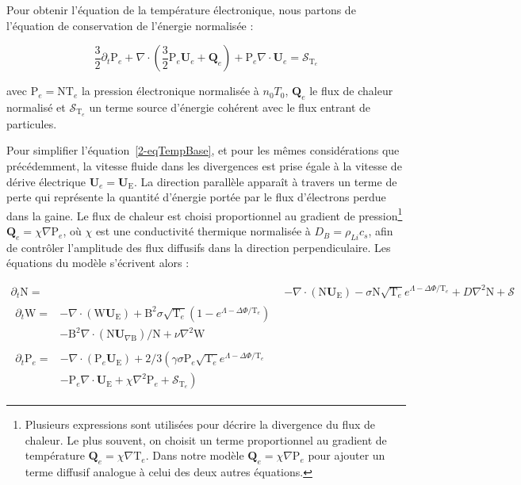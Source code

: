 \begin{refsection}
	Pour obtenir l'équation de la température électronique, nous partons de
	l'équation de conservation de l'énergie normalisée :
	
	\begin{equation} 
	\label{2-eqTempBase}
		\frac{3}{2}\partial_t \text{P}_e +
		\nabla\cdot\left(\frac{3}{2}\text{P}_e\mathbf{U}_e+\mathbf{Q}_e\right) +
		\text{P}_e\nabla\cdot\mathbf{U}_e=\mathcal{S}_{\text{T}_e} 
	\end{equation}
	
	avec $\text{P}_e=\text{NT}_e$ la pression électronique normalisée à $n_0T_0$,
	$\mathbf{Q}_e$ le flux de chaleur normalisé et $\mathcal{S}_{\text{T}_e}$ un
	terme source d'énergie cohérent avec le flux entrant de particules. 
	
	Pour simplifier l'équation~\ref{2-eqTempBase}, et pour les mêmes
	considérations que précédemment, la vitesse fluide dans les divergences est
	prise égale à la vitesse de dérive électrique $\mathbf U_e=\mathbf
	U_\text{E}$. La direction parallèle apparaît à travers un terme de
	perte qui représente la quantité d'énergie portée par le flux d'électrons
	perdue dans la gaine.
	Le flux de chaleur est choisi proportionnel au gradient de pression\footnote{Plusieurs expressions
	sont utilisées pour décrire la divergence du flux de chaleur. Le plus souvent,
	on choisit un terme proportionnel au gradient de température 
$\mathbf{Q}_e=\chi\nabla\text{T}_e$. Dans
notre modèle $\mathbf{Q}_e=\chi\nabla\text{P}_e$ pour ajouter un terme diffusif
analogue à celui des deux autres équations.}
$\mathbf{Q}_e=\chi\nabla\text{P}_e$, où $\chi$ est une conductivité thermique
normalisée à $D_B=\rho_{Li}c_s$, afin de contrôler l'amplitude des flux
diffusifs dans la direction perpendiculaire.
	Les équations du modèle s'écrivent alors :
	
\begin{align}
\label{2-eqContinuiteTemp}
\partial_t \text{N}
=& - \nabla\cdot\left(\text{N}\mathbf U_\text{E}\right) -\sigma
\text{N}\sqrt{\text{T}_e}e^{\Lambda-\Delta\Phi/\text{T}_e} + D\nabla^2 \text{N}
+ \mathcal{S}
\\[0.5cm]
\label{2-eqCourantTemp}
\begin{split}
\partial_{t}\text{W} =& 
-\nabla\cdot\left(\text{W}\mathbf U_\text{E}\right)
+\text{B}^2\sigma\sqrt{\text{T}_e}\left(1-e^{\Lambda-\Delta\Phi/\text{T}_e}\right)\\
&-\text{B}^2\nabla\cdot\left(\text{N}\mathbf
U_{\nabla\text{B}}\right)/\text{N} +\nu\nabla^2\text{W}
\end{split}
\\[0.5cm]
\label{2-eqEnergyTemp}
\begin{split}
\partial_{t}\text{P}_e=&
-\nabla\cdot\left(\text{P}_e\mathbf U_\text{E}\right)
+2/3\left(\gamma\sigma\text{P}_e\sqrt{\text{T}_e}e^{\Lambda-\Delta\Phi/\text{T}_e}\right.\\
&\left.-\text{P}_e\nabla\cdot\mathbf U_\text{E}
+\chi\nabla^2\text{P}_e
+\mathcal{S}_{\text{T}_e}\right)
\end{split}
\end{align}


\end{refsection}
